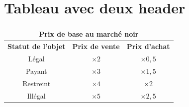 \documentclass{article}
\begin{document}
\section*{Tableau avec deux header}
\begin{tabular}{|c|c|c|}
	\hline 
	\multicolumn{3}{|c|}{\cellcolor{DarkRed} \textbf{{\large \textcolor{PureWhite}{Prix de base au marché noir}}}} \\ 
	\hline 
	\cellcolor{DarkGold}\textbf{Statut de l'objet} & \cellcolor{DarkGold}\textbf{Prix de vente} & \cellcolor{DarkGold}\textbf{Prix d'achat} \\ 
	\hline 
	Légal & $\times2$ & $\times0,5$ \\ 
	\hline 
	Payant & $\times3$ & $\times1,5$ \\ 
	\hline 
	Restreint & $\times4$ & $\times2$ \\ 
	\hline 
	Illégal & $\times5$ & $\times2,5$ \\ 
	\hline 
\end{tabular}
\end{document}
